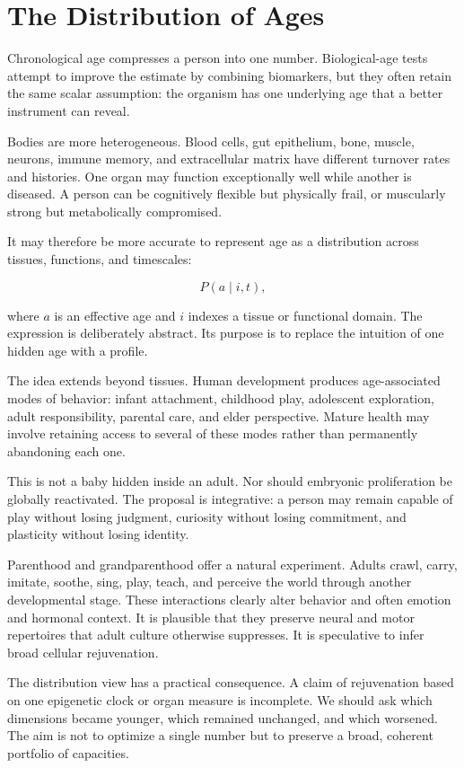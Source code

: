 \chapter{The Distribution of Ages}\label{chapter-12-the-distribution-of-ages}

Chronological age compresses a person into one number. Biological-age tests attempt to improve the estimate by combining biomarkers, but they often retain the same scalar assumption: the organism has one underlying age that a better instrument can reveal.

Bodies are more heterogeneous. Blood cells, gut epithelium, bone, muscle, neurons, immune memory, and extracellular matrix have different turnover rates and histories. One organ may function exceptionally well while another is diseased. A person can be cognitively flexible but physically frail, or muscularly strong but metabolically compromised.

It may therefore be more accurate to represent age as a distribution across tissues, functions, and timescales:

\[P(a\mid i,t),\]

where $a$ is an effective age and $i$ indexes a tissue or functional domain. The expression is deliberately abstract. Its purpose is to replace the intuition of one hidden age with a profile.

The idea extends beyond tissues. Human development produces age-associated modes of behavior: infant attachment, childhood play, adolescent exploration, adult responsibility, parental care, and elder perspective. Mature health may involve retaining access to several of these modes rather than permanently abandoning each one.

This is not a baby hidden inside an adult. Nor should embryonic proliferation be globally reactivated. The proposal is integrative: a person may remain capable of play without losing judgment, curiosity without losing commitment, and plasticity without losing identity.

Parenthood and grandparenthood offer a natural experiment. Adults crawl, carry, imitate, soothe, sing, play, teach, and perceive the world through another developmental stage. These interactions clearly alter behavior and often emotion and hormonal context. It is plausible that they preserve neural and motor repertoires that adult culture otherwise suppresses. It is speculative to infer broad cellular rejuvenation.

The distribution view has a practical consequence. A claim of rejuvenation based on one epigenetic clock or organ measure is incomplete. We should ask which dimensions became younger, which remained unchanged, and which worsened. The aim is not to optimize a single number but to preserve a broad, coherent portfolio of capacities.
